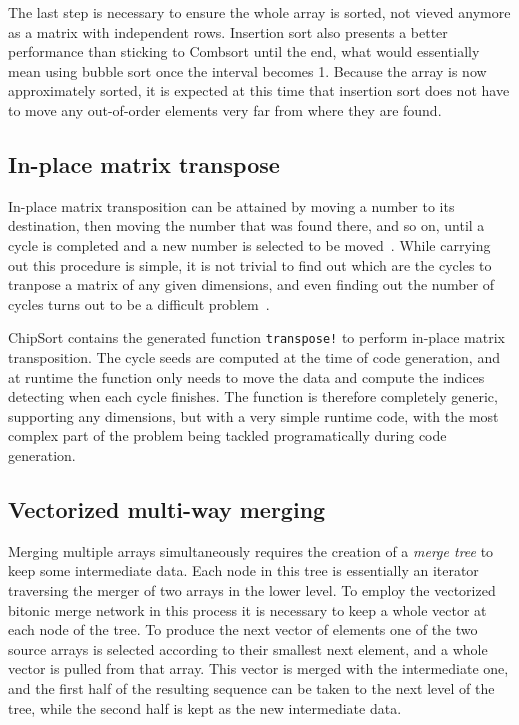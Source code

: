 \documentclass{juliacon}
\begin{document}
The last step is necessary to ensure the whole array is sorted, not vieved anymore as a matrix with independent rows. Insertion sort also presents a better performance than sticking to Combsort until the end, what would essentially mean using bubble sort once the interval becomes 1. Because the array is now approximately sorted, it is expected at this time that insertion sort does not have to move any out-of-order elements very far from where they are found.

\subsection{In-place matrix transpose}
%
In-place matrix transposition can be attained by moving a number to its destination, then moving the number that was found there, and so on, until a cycle is completed and a new number is selected to be moved~\cite{10.1093/comjnl/2.1.47}. While carrying out this procedure is simple, it is not trivial to find out which are the cycles to tranpose a matrix of any given dimensions, and even finding out the number of cycles turns out to be a difficult problem~\cite[Sec. 1.3.3, Ex. 12]{DBLP:books/lib/Knuth97}.

ChipSort contains the generated function {\tt transpose!} to perform in-place matrix transposition. The cycle seeds are computed at the time of code generation, and at runtime the function only needs to move the data and compute the indices detecting when each cycle finishes. The function is therefore completely generic, supporting any dimensions, but with a very simple runtime code, with the most complex part of the problem being tackled programatically during code generation.

\subsection{Vectorized multi-way merging}
%
Merging multiple arrays simultaneously requires the creation of a {\em merge tree} to keep some intermediate data. Each node in this tree is essentially an iterator traversing the merger of two arrays in the lower level. To employ the vectorized bitonic merge network in this process it is necessary to keep a whole vector at each node of the tree. To produce the next vector of elements one of the two source arrays is selected according to their smallest next element, and a whole vector is pulled from that array. This vector is merged with the intermediate one, and the first half of the resulting sequence can be taken to the next level of the tree, while the second half is kept as the new intermediate data.
\end{document}
